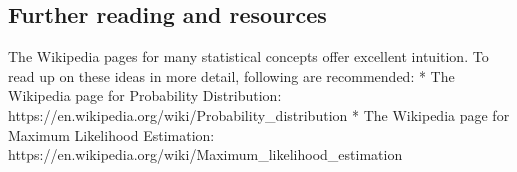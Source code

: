 \documentclass[11pt]{article}
\begin{document}
    \hypertarget{further-reading-and-resources}{%
\subsection{Further reading and
resources}\label{further-reading-and-resources}}

The Wikipedia pages for many statistical concepts offer excellent
intuition. To read up on these ideas in more detail, following are
recommended: * The Wikipedia page for Probability Distribution:
https://en.wikipedia.org/wiki/Probability\_distribution * The Wikipedia
page for Maximum Likelihood Estimation:
https://en.wikipedia.org/wiki/Maximum\_likelihood\_estimation


    
    
    
\end{document}
